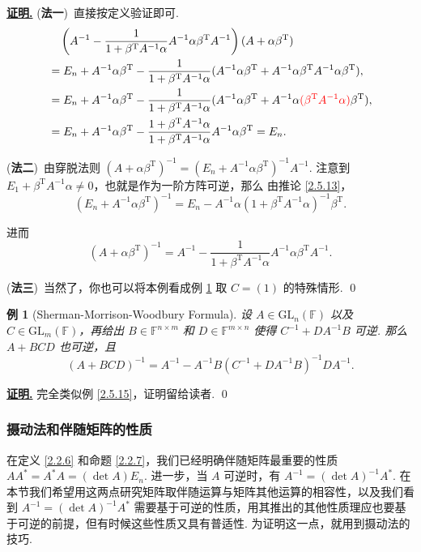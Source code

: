 \documentclass[10pt,openany]{article}
\theoremstyle{thmstyle} %
\theoremstyle{defstyle} %
\theoremstyle{prostyle} %
\theoremstyle{exastyle}
\newtheorem{example}[theorem]{例}
\theoremstyle{remstyle}
\renewenvironment{proof}[1][证明]{\par\underline{\textbf{#1.}} \;\fangsong}{\qed\par}
\newcommand{\T}{^{\text{T}}}
\newcommand{\F}{\mathbb{F}}
\newcommand{\gfn}{\text{GL}_n(\mathbb{F})}
\newcommand{\gfm}{\text{GL}_m(\mathbb{F})}
\newcommand{\mn}{^{m \times n}}
\newcommand{\nm}{^{n \times m}}
\begin{document}
\begin{proof}
	(\textbf{法一})\ 直接按定义验证即可. 
	\begin{align*}
		& \quad \left( A^{-1} - \frac{1}{1 + \beta\T A^{-1} \alpha} A^{-1} \alpha \beta\T A^{-1} \right)(A + \alpha \beta\T) \\
		&=E_n+A^{-1}\alpha\beta\T- \frac{1}{1 + \beta\T A^{-1} \alpha} (A^{-1}\alpha \beta\T+A^{-1}\alpha \beta\T A^{-1}\alpha \beta\T ), \\
		&=E_n+A^{-1}\alpha\beta\T- \frac{1}{1 + \beta\T A^{-1} \alpha} (A^{-1}\alpha \beta\T+A^{-1}\alpha{\color{red} (\beta\T A^{-1}\alpha)} \beta\T ), \\
		&=E_n+A^{-1}\alpha\beta\T- \frac{1 + \beta\T A^{-1} \alpha}{1 + \beta\T A^{-1} \alpha} A^{-1}\alpha \beta\T=E_n.
	\end{align*}
	
	(\textbf{法二})\ 由穿脱法则 \( (A+\alpha \beta\T)^{-1}=(E_n+A^{-1}\alpha \beta\T)^{-1} A^{-1} \). 注意到 \( E_1+\beta\T A^{-1}\alpha \neq 0 \)，也就是作为一阶方阵可逆，那么 由推论 \ref{2.5.13}，
	\[ (E_n+A^{-1}\alpha \beta\T)^{-1}=E_n-A^{-1}\alpha(1+\beta\T A^{-1}\alpha)^{-1}\beta\T. \]
	
	进而
	\[ (A+\alpha \beta\T)^{-1}=A^{-1}-\frac{1}{1+\beta\T A^{-1}\alpha} A^{-1}\alpha\beta\T A^{-1}. \] 
	
	(\textbf{法三})\ 当然了，你也可以将本例看成例 \ref{2.5.16} 取 \( C=(1) \) 的特殊情形.
\end{proof}


\begin{example}[Sherman-Morrison-Woodbury Formula] \label{2.5.16}
	 设 \( A \in \gfn \) 以及 \( C \in \gfm \)，再给出 \( B \in \F\nm \) 和 \( D \in \F\mn \) 使得 \( C^{-1} + D A^{-1} B \) 可逆. 那么 \( A + B C D \) 也可逆，且
	\[
	(A + BCD)^{-1} = A^{-1} - A^{-1} B \left( C^{-1} + D A^{-1} B \right)^{-1} D A^{-1}.
	\]
\end{example}

\begin{proof}
	完全类似例 \ref{2.5.15}，证明留给读者.
\end{proof}


\subsubsection{摄动法和伴随矩阵的性质}

在定义 \ref{2.2.6} 和命题 \ref{2.2.7}，我们已经明确伴随矩阵最重要的性质 \( AA^*=A^*A=(\det A)E_n \). 进一步，当 \( A \) 可逆时，有 \( A^{-1}=(\det A)^{-1}A^* \). 在本节我们希望用这两点研究矩阵取伴随运算与矩阵其他运算的相容性，以及我们看到 \( A^{-1}=(\det A)^{-1}A^* \) 需要基于可逆的性质，用其推出的其他性质理应也要基于可逆的前提，但有时候这些性质又具有普适性. 为证明这一点，就用到摄动法的技巧.
\end{document}
